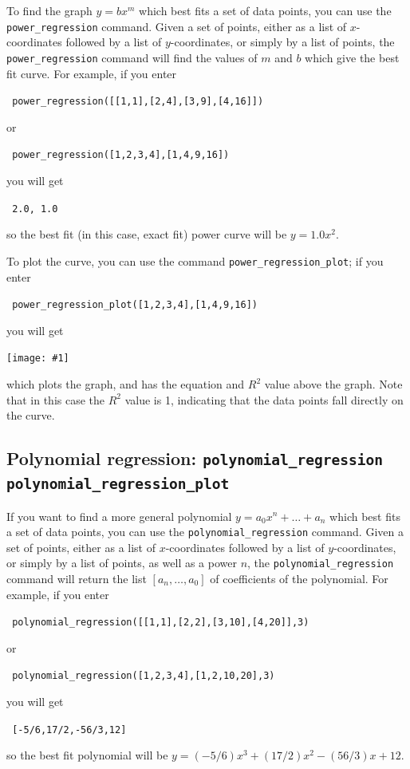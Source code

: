 \documentclass[a4paper,11pt]{book}
\newcommand{\includeimage}[1]
{\texttt{[image: \#1]}}
\begin{document}
To find the graph $y=bx^m$ which best fits a set of data points, you
can use the \texttt{power\_regression} command.
Given a set of points, either as a list of $x$-coordinates
followed by a list of $y$-coordinates, or simply by a list of points,
the \texttt{power\_regression} command will find the values of
$m$ and $b$ which give the best fit curve.  For example, if you
enter
\begin{center}
  \tt
  power\_regression([[1,1],[2,4],[3,9],[4,16]])
\end{center}
or
\begin{center}
  \tt
  power\_regression([1,2,3,4],[1,4,9,16])
\end{center}
you will get
\begin{center}
  \tt
  2.0, 1.0
\end{center}
so the best fit (in this case, exact fit) power curve will be $y = 1.0 x^2$.

To plot the curve, you can use the command
\texttt{power\_regression\_plot}; if you enter
\begin{center}
  \tt
    power\_regression\_plot([1,2,3,4],[1,4,9,16])
\end{center}
you will get
\begin{center}
  \includeimage{xcas-powregplot.png}
\end{center}
which plots the graph, and has the equation and $R^2$ value above the
graph.  Note that in this case the $R^2$ value is 1, indicating that
the data points fall directly on the curve.

\subsection{Polynomial regression: \texttt{polynomial\_regression} \texttt{polynomial\_regression\_plot}}

If you want to find a more general polynomial $y=a_0x^n + \dots + a_n$
which best fits a set of data points, you can use the
\texttt{polynomial\_regression} command. 
Given a set of points, either as a list of $x$-coordinates
followed by a list of $y$-coordinates, or simply by a list of points,
as well as a power $n$, the \texttt{polynomial\_regression} command
will return the list $[a_n,\dots,a_0]$ of coefficients of the
polynomial.  For example, if you enter
\begin{center}
  \tt
  polynomial\_regression([[1,1],[2,2],[3,10],[4,20]],3)
\end{center}
or
\begin{center}
  \tt
  polynomial\_regression([1,2,3,4],[1,2,10,20],3)
\end{center}
you will get
\begin{center}
  \tt
  [-5/6,17/2,-56/3,12]
\end{center}
so the best fit polynomial will be $y = (-5/6)x^3 + (17/2)x^2  -
(56/3)x + 12$.
\end{document}
